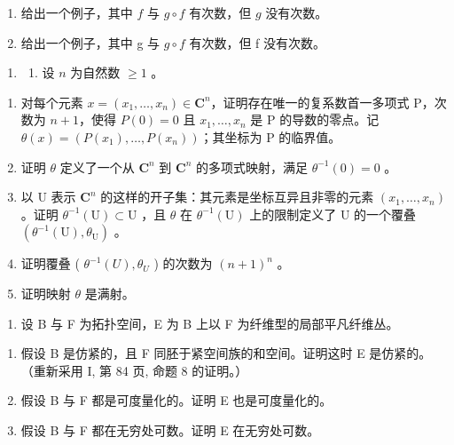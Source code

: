 \begin{enumerate}
\def\labelenumi{\alph{enumi})}
\item
  给出一个例子，其中 \(f\) 与 \(g \circ f\) 有次数，但 \(g\) 没有次数。
\item
  给出一个例子，其中 g 与 \(g \circ f\) 有次数，但 f 没有次数。
\end{enumerate}

\begin{enumerate}
\def\labelenumi{\arabic{enumi})}
\setcounter{enumi}{7}
\tightlist
\item
  \begin{enumerate}
  \def\labelenumii{(\arabic{enumii})}
  \setcounter{enumii}{1}
  \tightlist
  \item
    设 \(n\) 为自然数 \(\geqslant 1\) 。
  \end{enumerate}
\end{enumerate}

\begin{enumerate}
\def\labelenumi{\alph{enumi})}
\item
  对每个元素 \(x=(x_{1},\ldots,x_{n})\in\mathbf{C}^{n}\)，证明存在唯一的复系数首一多项式 P，次数为 \(n+1\)，使得 \(P(0)=0\) 且 \(x_{1},\ldots,x_{n}\) 是 P 的导数的零点。记 \(\theta(x)=(P(x_{1}),\ldots,P(x_{n}))\)；其坐标为 P 的临界值。
\item
  证明 \(\theta\) 定义了一个从 \(\mathbf{C}^n\) 到 \(\mathbf{C}^n\) 的多项式映射，满足 \(\theta^{-1}(0) = 0\) 。
\item
  以 U 表示 \(\mathbf{C}^{n}\) 的这样的开子集：其元素是坐标互异且非零的元素 \((x_{1},\ldots,x_{n})\) 。证明 \(\theta^{-1}\left(\mathrm{U}\right)\subset\mathrm{U}\) ，且 \(\theta\) 在 \(\theta^{-1}\left(\mathrm{U}\right)\) 上的限制定义了 U 的一个覆叠 \((\theta^{-1}\left(\mathrm{U}\right),\theta_{\mathrm{U}})\) 。
\item
  证明覆叠 ( \(\theta^{-1}(U),\theta_{U}\) ) 的次数为 \((n+1)^{n}\) 。
\item
  证明映射 \(\theta\) 是满射。
\end{enumerate}

\begin{enumerate}
\def\labelenumi{\arabic{enumi})}
\setcounter{enumi}{8}
\tightlist
\item
  设 B 与 F 为拓扑空间，E 为 B 上以 F 为纤维型的局部平凡纤维丛。
\end{enumerate}

\begin{enumerate}
\def\labelenumi{\alph{enumi})}
\item
  假设 B 是仿紧的，且 F 同胚于紧空间族的和空间。证明这时 E 是仿紧的。（重新采用 I, 第 84 页, 命题 8 的证明。）
\item
  假设 B 与 F 都是可度量化的。证明 E 也是可度量化的。
\item
  假设 B 与 F 都在无穷处可数。证明 E 在无穷处可数。
\end{enumerate}

